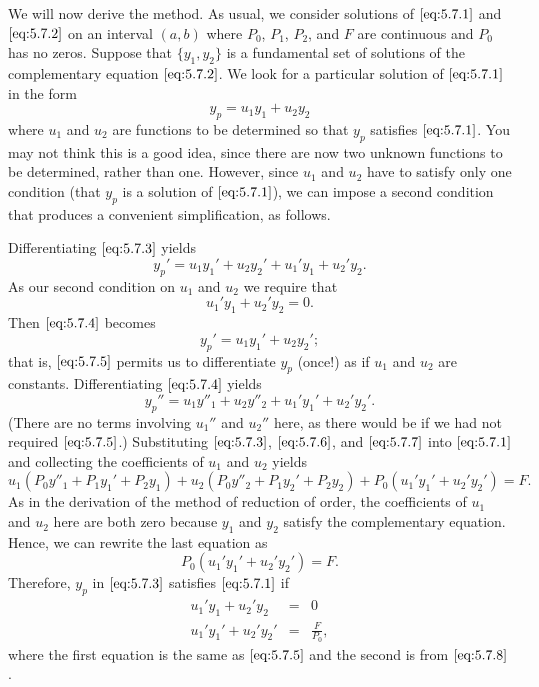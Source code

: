 \documentclass{ximera}
\begin{document}
We will now derive the method. As usual, we consider solutions of
$\eqref{eq:5.7.1}$ and $\eqref{eq:5.7.2}$ on an interval $(a,b)$ where $P_0$,
$P_1$, $P_2$, and $F$ are continuous and $P_0$ has no zeros. Suppose
that $\{y_1,y_2\}$ is a fundamental set of solutions of the
complementary equation $\eqref{eq:5.7.2}$. We look for
a particular solution of $\eqref{eq:5.7.1}$ in the form
\begin{equation} \label{eq:5.7.3}
y_p=u_1y_1+u_2y_2
\end{equation}
where $u_1$ and $u_2$ are functions to be determined so that $y_p$
satisfies $\eqref{eq:5.7.1}$. You may not think this is a good idea, since
there are now two unknown functions to be determined, rather than one.
However, since $u_1$ and $u_2$ have to satisfy only one condition
(that $y_p$ is a solution of $\eqref{eq:5.7.1}$), we can impose a second
condition that produces a convenient simplification, as follows.
 
Differentiating $\eqref{eq:5.7.3}$ yields
\begin{equation} \label{eq:5.7.4}
y_p'=u_1y_1'+u_2y_2'+u_1'y_1+u_2'y_2.
\end{equation}
As our second condition on $u_1$ and $u_2$
 we require that
\begin{equation} \label{eq:5.7.5}
u_1'y_1+u_2'y_2=0.
\end{equation}
Then $\eqref{eq:5.7.4}$ becomes
\begin{equation}
y_p'=u_1y_1'+u_2y_2';     \label{eq:5.7.6}
\end{equation}
that is, $\eqref{eq:5.7.5}$ permits us to differentiate $y_p$ (once!) as if
 $u_1$ and $u_2$ are constants. Differentiating
$\eqref{eq:5.7.4}$ yields \begin{equation} \label{eq:5.7.7}
y_p''=u_1y''_1+u_2y''_2+u_1'y_1'+u_2'y_2'. \end{equation}
(There are no terms involving $u_1''$ and $u_2''$ here, as there would
be if we had not required $\eqref{eq:5.7.5}$.) Substituting $\eqref{eq:5.7.3}$,
$\eqref{eq:5.7.6}$, and $\eqref{eq:5.7.7}$ into $\eqref{eq:5.7.1}$ and collecting the
coefficients of $u_1$ and $u_2$ yields
$$
u_1(P_0y''_1+P_1y_1'+P_2y_1)+u_2(P_0y''_2+P_1y_2'+P_2y_2)
+P_0(u_1'y_1'+u_2'y_2')=F.
$$
As in the derivation of the method of reduction of order, the
coefficients of $u_1$ and $u_2$ here are both zero because $y_1$ and
$y_2$ satisfy the complementary equation. Hence, we can rewrite the
last equation as
\begin{equation}\label{eq:5.7.8}
  P_0(u_1'y_1'+u_2'y_2')=F.
\end{equation}
Therefore, $y_p$ in $\eqref{eq:5.7.3}$ satisfies $\eqref{eq:5.7.1}$ if
\begin{equation} \label{eq:5.7.9}
\begin{array}{rcl}
u_1'y_1+u_2'y_2 &=& 0  \\
u_1'y_1'+u_2'y_2' &=& \frac{F}{P_0},
\end{array}
\end{equation}
where the first equation is the same as $\eqref{eq:5.7.5}$ and the second is from $\eqref{eq:5.7.8}$.
 
\end{document}
